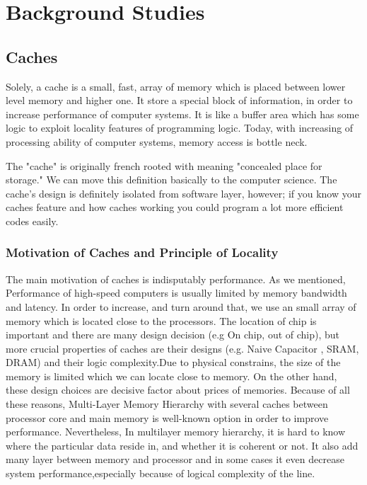 \chapter{Background Studies}
\section{Caches}
    Solely, a cache is a small, fast, array of memory which is placed between lower level memory and higher one.  It store a special block of information, in order to increase performance of computer systems. It is like a buffer area which has some logic to exploit locality features of programming logic. Today, with increasing of processing ability of computer systems, memory access is bottle neck. 

    The "cache" is originally french rooted with meaning "concealed place for storage."\cite{sloss2004arm} We can move this definition basically to the computer science. The cache's design is definitely  isolated from software layer, however; if you know your caches feature and how caches working you could program a lot more efficient codes easily.



    \subsection{Motivation of Caches and Principle of Locality}
    The main motivation of caches is indisputably performance. As we mentioned,  Performance of high-speed computers is usually limited by memory bandwidth and latency. In order to increase, and turn around that, we use an small array of memory which is located close to the processors.  The location of chip is important and there are many design decision (e.g On chip, out of chip), but more crucial  properties of caches are their designs (e.g. Naive Capacitor , SRAM, DRAM) and their logic complexity\cite{hennessy2012computer}.Due to physical constrains, the size of the memory is limited which we can locate close to memory. On the other hand, these design choices are decisive factor about prices of memories.  Because of all these reasons, Multi-Layer Memory Hierarchy with several caches  between processor core and main memory is well-known option in order to improve performance. Nevertheless, In multilayer memory hierarchy, it is hard to know where the particular data reside in, and whether it is coherent or not. It also add many layer between memory and processor and in some cases it even decrease system performance,especially because of logical complexity of the line.

